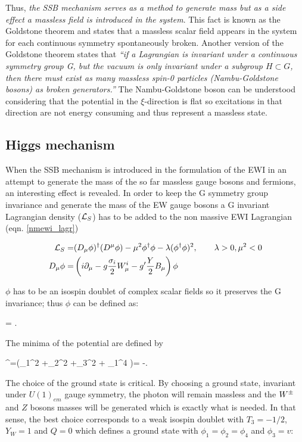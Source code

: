\noindent Thus, \textit {the SSB mechanism serves as a method to generate mass but as a side effect a massless field is introduced in the system}. This fact is known as the Goldstone theorem and states that a massless scalar field appears in the system for each continuous symmetry spontaneously broken. Another version of the Goldstone theorem states that \textit{``if a Lagrangian is invariant under a continuous symmetry group G, but the vacuum is only invariant under a subgroup $H\subset G$, then there must exist as many massless spin-0 particles (Nambu-Goldstone bosons) as broken generators.''}\cite{pich} The Nambu-Goldstone boson can be understood considering that the potential in the $\xi$-direction is flat so excitations in that direction are not energy consuming and thus represent a massless state.                   

\subsection{Higgs mechanism}

\noindent When the SSB mechanism is introduced in the formulation of the EWI in an attempt to generate the mass of the so far massless gauge bosons and fermions, an interesting effect is revealed. In order to keep the G symmetry group invariance and generate the mass of the EW gauge bosons a G invariant Lagrangian density ($\mathcal{L}_S$) has to be added to the non massive EWI Lagrangian (eqn. \ref{nmewi_lagr})

\begin{align}
\mathcal{L}_S    = &(D_\mu\phi)^\dagger(D^\mu\phi) - \mu^2\phi^\dagger\phi - \lambda(\phi^\dagger\phi)^2 , \qquad \lambda>0, \mu^2<0 \label{ls}\\
D_\mu\phi = &\left(i\partial_\mu - g\frac{\sigma_i}{2}W^i_\mu -
g'\frac{Y}{2}B_\mu\right)\phi
\end{align}

\noindent $\phi$ has to be an isospin doublet of complex scalar fields so it preserves the G invariance; thus $\phi$ can be defined as:

\beqn
\phi =  \equiv {}.
\eeqn

\noindent The minima of the potential are defined by

\beqn
\phi^\dagger\phi=(\phi_1^2 +\phi_2^2 +\phi_3^2 + \phi_1^4 )= -.
\eeqn

\noindent The choice of the ground state is critical. By choosing a ground state, invariant under $U(1)_{em}$ gauge symmetry, the photon will remain massless and the $W^\pm$ and $Z$ bosons masses will be generated which is exactly what is needed. In that sense, the best choice corresponds to a weak isospin doublet with $T_3=-1/2$, $Y_W=1$ and $Q=0$ which defines a ground state with $\phi_1=\phi_2=\phi_4$ and $\phi_3=v$:

